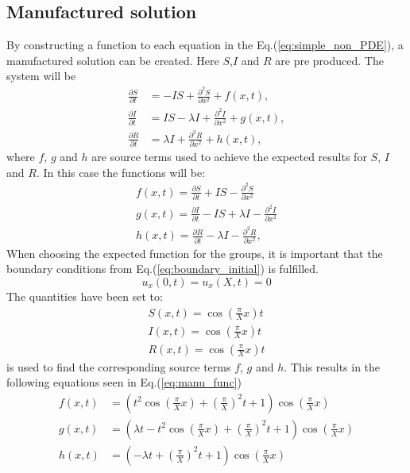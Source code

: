 \documentclass[%
twoside,                 %
final,                   %
chapterprefix=true,      %
open=right               %
10pt]{book}
\begin{document}
\subsection{Manufactured solution}
By constructing a function to each equation in the Eq.(\ref{eq:simple_non_PDE}), a manufactured solution can be created. Here $S$,$I$ and $R$ are pre produced. The system will be
\begin{equation} \label{eq:simple_non_PDE3}
	\begin{aligned}
	\frac{\partial S}{\partial t} &= -IS + \frac{\partial^2 S}{\partial x^2}+f(x,t),\\
	\frac{\partial I}{\partial t} &= IS- \lambda I + \frac{\partial^2 I}{\partial x^2}+g(x,t),\\
	\frac{\partial R}{\partial t} &= \lambda I + \frac{\partial^2 R}{\partial x^2}+h(x,t),
	\end{aligned}
\end{equation}
where $f$, $g$ and $h$ are source terms used to achieve the expected results for $S$, $I$ and $R$. In this case the functions will be:
\begin{equation}
	\begin{aligned}
	f(x,t) = \frac{\partial S}{\partial t} + IS - \frac{\partial^2 S}{\partial x^2}\\
	g(x,t) = \frac{\partial I}{\partial t} - IS + \lambda I - \frac{\partial^2 I}{\partial x^2}\\
	h(x,t) = \frac{\partial R}{\partial t} -\lambda I - \frac{\partial^2 R}{\partial x^2},
	\end{aligned}
\end{equation}
When choosing the expected function for the groups, it is important that the boundary conditions from Eq.(\ref{eq:boundary_initial}) is fulfilled.
\begin{equation}
    u_x(0,t) = u_x(X,t) = 0
\end{equation}
The quantities have been set to:
\begin{equation}
	\begin{aligned}
    S(x,t) = \cos(\frac{\pi}{X}x)t\\
    I(x,t) = \cos(\frac{\pi}{X}x)t\\
    R(x,t) = \cos(\frac{\pi}{X}x)t
	\end{aligned}
\end{equation}
 is used to find the corresponding source terms $f$, $g$ and $h$. This results in the following equations seen in Eq.(\ref{eq:manu_func}) 
\begin{equation} \label{eq:manu_func}
	\begin{aligned}
	f(x,t) &= (t^2\cos(\frac{\pi}{X} x) + (\frac{\pi}{X})^2t + 1)\cos(\frac{\pi}{X} x)\\
	g(x,t) &= (\lambda t - t^2\cos(\frac{\pi}{X} x) + (\frac{\pi}{X})^2t + 1)\cos(\frac{\pi}{X} x)\\
	h(x,t) &= (-\lambda t + (\frac{\pi}{X})^2t + 1)\cos(\frac{\pi}{X} x)
	\end{aligned}
\end{equation}
\end{document}
